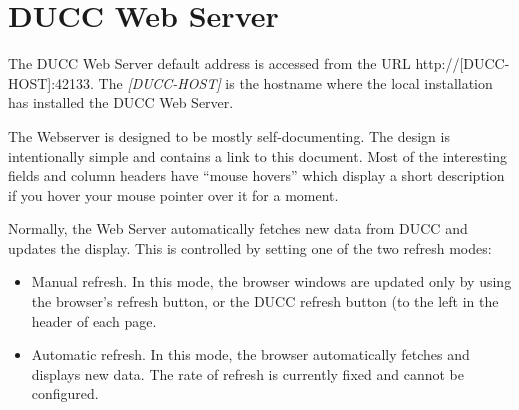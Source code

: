 % 
% 
% 
% 
\ifpdf
\else
{}
\fi
\chapter{DUCC Web Server}

    The DUCC Web Server default address is accessed from the URL http://[DUCC-HOST]:42133.  The
    {\em[DUCC-HOST]} is the hostname where the local installation has installed the DUCC
    Web Server.
    
  \begin{center}     
  \end{center}
  
    The Webserver is designed to be mostly self-documenting. The design is intentionally simple 
    and contains a link to this document.  Most of the interesting fields and column headers
    have ``mouse hovers'' which display a short 
    description if you hover your mouse pointer over it for a moment.

    Normally, the Web Server automatically fetches new data from DUCC and updates the display.
    This is controlled by setting one of the two refresh modes:
    \begin{itemize}
      \item Manual refresh.  In this mode, the browser windows are updated only by using the
        browser's refresh button, or the DUCC refresh button (to the left in the header of
        each page.
      \item Automatic refresh. In this mode, the browser automatically fetches and displays
        new data.  The rate of refresh is currently fixed and cannot be configured.
    \end{itemize}
    

